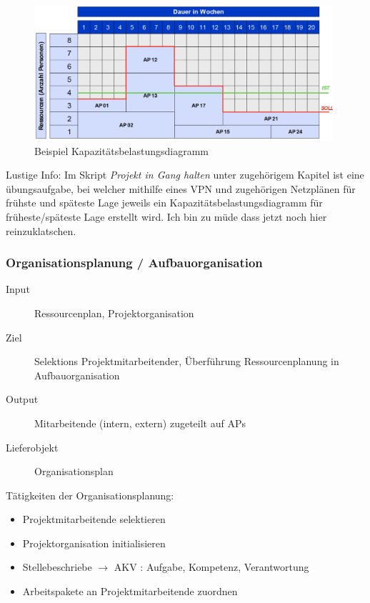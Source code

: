\documentclass[a4paper]{article}
\begin{document}
			\begin{figure}[!htb]
				\centering
				\includegraphics[height=5cm]{img/pm/belastung_dia.png}
				\caption{Beispiel Kapazitätsbelastungsdiagramm}
				\label{fig:pm_belastung_diagramm}
			\end{figure}
			\noindent
			Lustige Info: Im Skript \textit{Projekt in Gang halten} unter zugehörigem Kapitel ist eine übungsaufgabe, bei welcher mithilfe eines VPN und zugehörigen Netzplänen für frühste und späteste Lage jeweils ein Kapazitätsbelastungsdiagramm für früheste/späteste Lage erstellt wird.
			Ich bin zu müde dass jetzt noch hier reinzuklatschen.
			
\newpage

		\subsubsection{Organisationsplanung / Aufbauorganisation}
			
			\begin{description}
				\item[Input] Ressourcenplan, Projektorganisation
				\item[Ziel] Selektions Projektmitarbeitender, Überführung Ressourcenplanung in Aufbauorganisation
				\item[Output] Mitarbeitende (intern, extern) zugeteilt auf APs
				\item[Lieferobjekt] Organisationsplan
			\end{description}
			\vspace{1em}
			\noindent
			Tätigkeiten der Organisationsplanung:
			\begin{itemize}
				\item Projektmitarbeitende selektieren
				\item Projektorganisation initialisieren
				\item Stellebeschriebe $\rightarrow$ AKV : Aufgabe, Kompetenz, Verantwortung
				\item Arbeitspakete an Projektmitarbeitende zuordnen
			\end{itemize}
		
\end{document}
